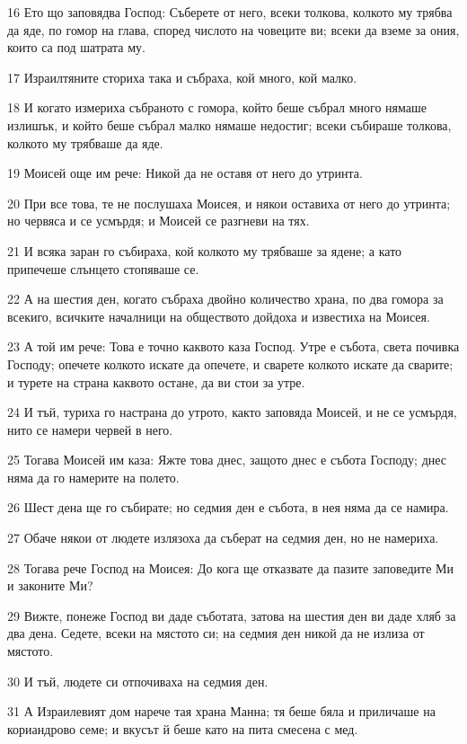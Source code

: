 \par 16 Ето що заповядва Господ: Съберете от него, всеки толкова, колкото му трябва да яде, по гомор на глава, според числото на човеците ви; всеки да вземе за ония, които са под шатрата му.
\par 17 Израилтяните сториха така и събраха, кой много, кой малко.
\par 18 И когато измериха събраното с гомора, който беше събрал много нямаше излишък, и който беше събрал малко нямаше недостиг; всеки събираше толкова, колкото му трябваше да яде.
\par 19 Моисей още им рече: Никой да не оставя от него до утринта.
\par 20 При все това, те не послушаха Моисея, и някои оставиха от него до утринта; но червяса и се усмърдя; и Моисей се разгневи на тях.
\par 21 И всяка заран го събираха, кой колкото му трябваше за ядене; а като припечеше слънцето стопяваше се.
\par 22 А на шестия ден, когато събраха двойно количество храна, по два гомора за всекиго, всичките началници на обществото дойдоха и известиха на Моисея.
\par 23 А той им рече: Това е точно каквото каза Господ. Утре е събота, света почивка Господу; опечете колкото искате да опечете, и сварете колкото искате да сварите; и турете на страна каквото остане, да ви стои за утре.
\par 24 И тъй, туриха го настрана до утрото, както заповяда Моисей, и не се усмърдя, нито се намери червей в него.
\par 25 Тогава Моисей им каза: Яжте това днес, защото днес е събота Господу; днес няма да го намерите на полето.
\par 26 Шест дена ще го събирате; но седмия ден е събота, в нея няма да се намира.
\par 27 Обаче някои от людете излязоха да съберат на седмия ден, но не намериха.
\par 28 Тогава рече Господ на Моисея: До кога ще отказвате да пазите заповедите Ми и законите Ми?
\par 29 Вижте, понеже Господ ви даде съботата, затова на шестия ден ви даде хляб за два дена. Седете, всеки на мястото си; на седмия ден никой да не излиза от мястото.
\par 30 И тъй, людете си отпочиваха на седмия ден.
\par 31 А Израилевият дом нарече тая храна Манна; тя беше бяла и приличаше на кориандрово семе; и вкусът й беше като на пита смесена с мед.
